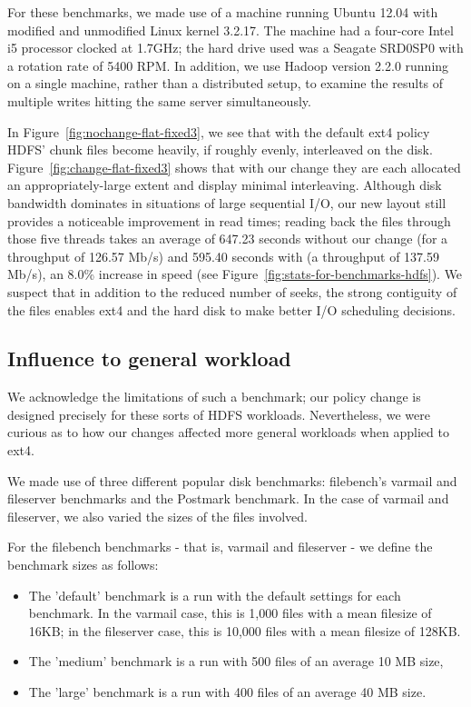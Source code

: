 \documentclass{acm_proc_article-sp}
\begin{document}
For these benchmarks, we made use of a machine running Ubuntu 12.04 with modified and unmodified Linux kernel 3.2.17.  The machine had a four-core Intel i5 processor clocked at 1.7GHz; the hard drive used was a Seagate SRD0SP0 with a rotation rate of 5400 RPM.  In addition, we use Hadoop version 2.2.0 running on a single machine, rather than a distributed setup, to examine the results of multiple writes hitting the same server simultaneously.
 
In Figure~\ref{fig:nochange-flat-fixed3}, we see that with the default ext4 policy HDFS' chunk files become heavily, if roughly evenly, interleaved on the disk.  Figure~\ref{fig:change-flat-fixed3} shows that with our change they are each allocated an appropriately-large extent and display minimal interleaving.  Although disk bandwidth dominates in situations of large sequential I/O, our new layout still provides a noticeable improvement in read times; reading back the files through those five threads takes an average of 647.23 seconds without our change (for a throughput of 126.57 Mb/s) and 595.40 seconds with (a throughput of 137.59 Mb/s), an 8.0\%  increase in speed (see Figure~\ref{fig:stats-for-benchmarks-hdfs}).  We suspect that in addition to the reduced number of seeks, the strong contiguity of the files enables ext4 and the hard disk to make better I/O scheduling decisions.

\subsection{Influence to general workload}
We acknowledge the limitations of such a benchmark; our policy change is designed precisely for these sorts of HDFS workloads.  Nevertheless, we were curious as to how our changes affected more general workloads when applied to ext4.
 
We made use of three different popular disk benchmarks: filebench's varmail and fileserver benchmarks and the Postmark benchmark.  In the case of varmail and fileserver, we also varied the sizes of the files involved.
 
For the filebench benchmarks - that is, varmail and fileserver - we define the benchmark sizes as follows:

\begin{itemize}
	\item The 'default' benchmark is a run with the default settings for each benchmark.  In the varmail case, this is 1,000 files with a mean filesize of 16KB; in the fileserver case, this is 10,000 files with a mean filesize of 128KB.

	\item The 'medium' benchmark is a run with 500 files of an average 10 MB size,

	\item The 'large' benchmark is a run with 400 files of an average 40 MB size.
\end{itemize}
\end{document}
